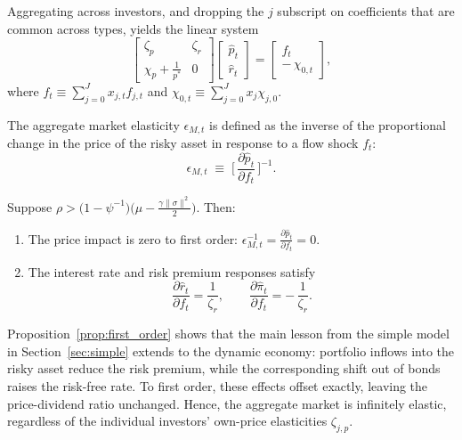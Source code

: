 Aggregating across investors, and dropping the $j$ subscript on coefficients that are common across types, yields the linear system
\[
    \begin{bmatrix}
        \zeta_p & \zeta_r \\
        \chi_p + \tfrac{1}{p^*} & 0
    \end{bmatrix}
    \begin{bmatrix}
        \hat{p}_t \\[4pt]
        \hat{r}_t
    \end{bmatrix}
    =
    \begin{bmatrix}
        f_t \\[4pt]
        -\,\chi_{0,t}
    \end{bmatrix},
\]
where $f_t \equiv \sum_{j=0}^J x_{j,t} f_{j,t}$ and $\chi_{0,t} \equiv \sum_{j=0}^J x_j \chi_{j,0}$.

\begin{defn}
The aggregate market elasticity $\epsilon_{M,t}$ is defined as the inverse of the proportional change in the price of the risky asset in response to a flow shock $f_t$:
\[
    \epsilon_{M,t} \;\equiv\; \Big[\,\frac{\partial \hat{p}_t}{\partial f_t}\,\Big]^{-1}.
\]
\end{defn}

\begin{prop}\label{prop:first_order}
Suppose $\rho>\big(1-\psi^{-1}\big)\big(\mu - \tfrac{\gamma\|\sigma\|^2}{2}\big)$. Then:
\begin{enumerate}[label=(\roman*)]
    \item The price impact is zero to first order:
    \(
        \epsilon_{M,t}^{-1}=\frac{\partial \hat{p}_t}{\partial f_t}=0 .
    \)
    \item The interest rate and risk premium responses satisfy
    \[
        \frac{\partial \hat{r}_t}{\partial f_t}=\frac{1}{\zeta_r},
        \qquad
        \frac{\partial \hat{\pi}_t}{\partial f_t}=-\,\frac{1}{\zeta_r}.
    \]
\end{enumerate}
\end{prop}

Proposition~\ref{prop:first_order} shows that the main lesson from the simple model in Section~\ref{sec:simple} extends to the dynamic economy: portfolio inflows into the risky asset reduce the risk premium, while the corresponding shift out of bonds raises the risk-free rate. To first order, these effects offset exactly, leaving the price-dividend ratio unchanged. Hence, the aggregate market is infinitely elastic, regardless of the individual investors’ own-price elasticities $\zeta_{j,p}$.


